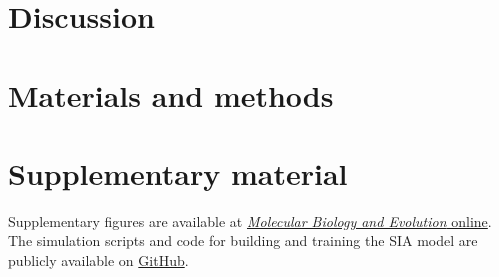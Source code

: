 \section{Discussion} \label{discussion}

\section{Materials and methods} \label{methods}

\section{Supplementary material}

Supplementary figures are available at \href{https://academic.oup.com/mbe/article/39/1/msab332/6433161#supplementary-data}{\textit{Molecular Biology and Evolution} online}. The simulation scripts and code for building and training the \ac{SIA} model are publicly available on \href{https://github.com/CshlSiepelLab/arg-selection}{GitHub}.